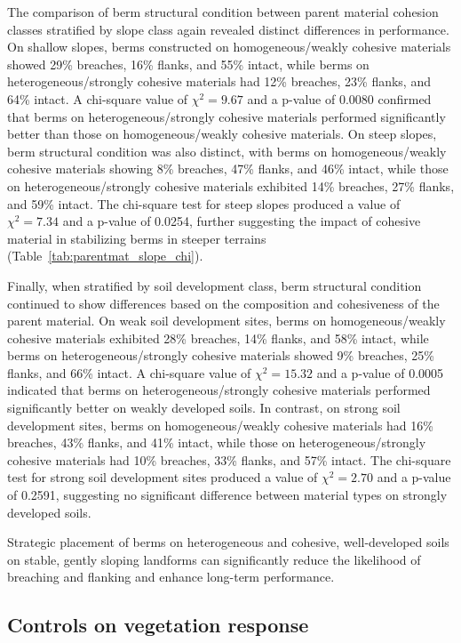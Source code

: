 \documentclass[review]{elsarticle}
\begin{document}
The comparison of berm structural condition between parent material cohesion classes stratified by slope class again revealed distinct differences in performance. On shallow slopes, berms constructed on homogeneous/weakly cohesive materials showed 29\% breaches, 16\% flanks, and 55\% intact, while berms on heterogeneous/strongly cohesive materials had 12\% breaches, 23\% flanks, and 64\% intact. A chi-square value of $\chi^2 = 9.67$ and a p-value of 0.0080 confirmed that berms on heterogeneous/strongly cohesive materials performed significantly better than those on homogeneous/weakly cohesive materials. On steep slopes, berm structural condition was also distinct, with berms on homogeneous/weakly cohesive materials showing 8\% breaches, 47\% flanks, and 46\% intact, while those on heterogeneous/strongly cohesive materials exhibited 14\% breaches, 27\% flanks, and 59\% intact. The chi-square test for steep slopes produced a value of $\chi^2 = 7.34$ and a p-value of 0.0254, further suggesting the impact of cohesive material in stabilizing berms in steeper terrains (Table~\ref{tab:parentmat_slope_chi}).


Finally, when stratified by soil development class, berm structural condition continued to show differences based on the composition and cohesiveness of the parent material. On weak soil development sites, berms on homogeneous/weakly cohesive materials exhibited 28\% breaches, 14\% flanks, and 58\% intact, while berms on heterogeneous/strongly cohesive materials showed 9\% breaches, 25\% flanks, and 66\% intact. A chi-square value of $\chi^2 = 15.32$ and a p-value of 0.0005 indicated that berms on heterogeneous/strongly cohesive materials performed significantly better on weakly developed soils. In contrast, on strong soil development sites, berms on homogeneous/weakly cohesive materials had 16\% breaches, 43\% flanks, and 41\% intact, while those on heterogeneous/strongly cohesive materials had 10\% breaches, 33\% flanks, and 57\% intact. The chi-square test for strong soil development sites produced a value of $\chi^2 = 2.70$ and a p-value of 0.2591, suggesting no significant difference between material types on strongly developed soils.


Strategic placement of berms on heterogeneous and cohesive, well-developed soils on stable, gently sloping landforms can significantly reduce the likelihood of breaching and flanking and enhance long-term performance.

\subsection{Controls on vegetation response}
\end{document}
